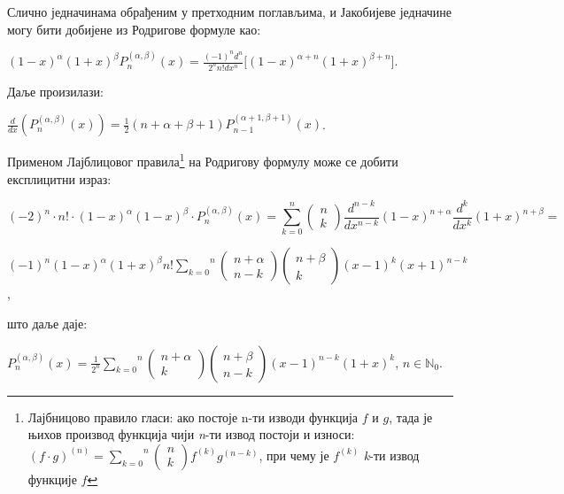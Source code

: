 Слично једначинама обрађеним у претходним поглављима, и Јакобијеве
једначине могу бити добијене из Родригове формуле као:

\({(1 - x)}^{\alpha}{(1 + x)}^{\beta}P_{n}^{(\alpha,\beta)}(x) = \frac{{( - 1)}^{n}d^{n}}{2^{n}n!dx^{n}}\lbrack{(1 - x)}^{\alpha + n}{(1 + x)}^{\beta + n}\rbrack\).

Даље произилази:

\(\frac{d}{dx}(P_{n}^{(\alpha,\beta)}(x)) = \frac{1}{2}(n + \alpha + \beta + 1)P_{n - 1}^{(\alpha + 1,\beta + 1)}(x)\).

Применом Лајблицовог правила\footnote{Лајбницово правило гласи: ако
  постоје n-ти изводи функција \(f\) и \(g\), тада је њихов производ
  функција чији \emph{n}-ти извод постоји и износи:
  \({(f \cdot g)}^{(n)} = \overset{n}{\sum_{k = 0}}\left( \begin{array}{r}
  n \\
  k
  \end{array} \right)f^{(k)}g^{(n - k)}\), при чему је \(f^{(k)}\)
  \emph{k}-ти извод функције \(f\)} на Родригову формулу може се добити
експлицитни израз:

\[{( - 2)}^{n} \cdot n! \cdot {(1 - x)}^{\alpha}{(1 - x)}^{\beta} \cdot P_{n}^{(\alpha,\beta)}(x) = \overset{n}{\sum_{k = 0}}\left( \begin{array}{r}
n \\
k
\end{array} \right)\frac{d^{n - k}}{dx^{n - k}}{(1 - x)}^{n + \alpha}\frac{d^{k}}{dx^{k}}{(1 + x)}^{n + \beta} =\]

\({( - 1)}^{n}{(1 - x)}^{\alpha}{(1 + x)}^{\beta}n!\overset{n}{\sum_{k = 0}}\left( \begin{array}{r}
n + \alpha \\
n - k
\end{array} \right)\left( \begin{array}{r}
n + \beta \\
k
\end{array} \right){(x - 1)}^{k}{(x + 1)}^{n - k}\),

што даље даје:

\(P_{n}^{(\alpha,\beta)}(x) = \frac{1}{2^{n}}\overset{n}{\sum_{k = 0}}\left( \begin{array}{r}
n + \alpha \\
k
\end{array} \right)\left( \begin{array}{r}
n + \beta \\
n - k
\end{array} \right){(x - 1)}^{n - k}{(1 + x)}^{k}\),
\(n \in \mathbb{N}_{0}\).

